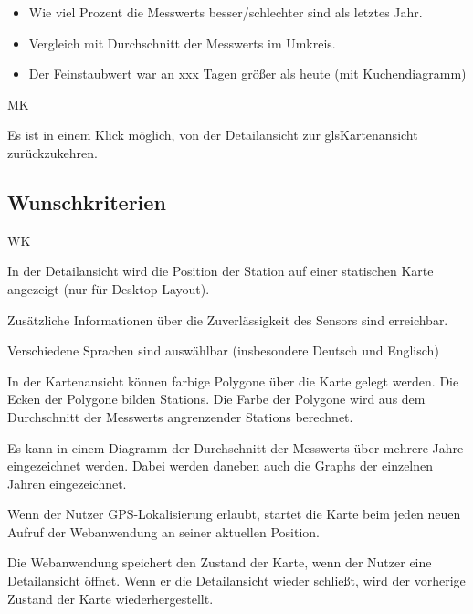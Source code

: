 \begin{itemize}
	\item Wie viel Prozent die \glspl{Messwert} besser/schlechter sind als letztes Jahr.
    \item Vergleich mit Durchschnitt der \glspl{Messwert} im Umkreis.
    \item Der Feinstaubwert war an xxx Tagen größer als heute (mit \gls{Kuchendiagramm})
\end{itemize}

\begin{Kriterien}{MK}	

	\item Es ist in einem Klick möglich, von der \gls{Detailansicht} zur gls{Kartenansicht} zurückzukehren.

\end{Kriterien}

\newpage
\subsection{Wunschkriterien}
\setcounter{counter}{10}
\begin{Kriterien}{WK}

	\item In der \gls{Detailansicht} wird die Position der \gls{Station} auf einer statischen Karte angezeigt (nur für Desktop 
	Layout). 

	\item Zusätzliche Informationen über die Zuverlässigkeit des Sensors sind erreichbar.

	\item Verschiedene Sprachen sind auswählbar (insbesondere Deutsch und Englisch)
	
	\item In der \gls{Kartenansicht} können farbige Polygone über die Karte gelegt werden. Die Ecken der Polygone bilden \glspl{Station}. Die Farbe der Polygone wird aus dem Durchschnitt der \glspl{Messwert} angrenzender \glspl{Station} berechnet.
	
	\item Es kann in einem Diagramm der Durchschnitt der \glspl{Messwert} über mehrere Jahre eingezeichnet werden. Dabei werden daneben auch die \glspl{Graph} der einzelnen Jahren eingezeichnet.
	
	\item Wenn der Nutzer GPS-Lokalisierung erlaubt, startet die Karte beim jeden neuen Aufruf der \gls{Webanwendung} an seiner aktuellen Position.
	
	\item Die Webanwendung speichert den Zustand der Karte, wenn der Nutzer eine \gls{Detailansicht} öffnet. Wenn er die \gls{Detailansicht} wieder schließt, wird der vorherige Zustand der Karte wiederhergestellt.

\end{Kriterien}

